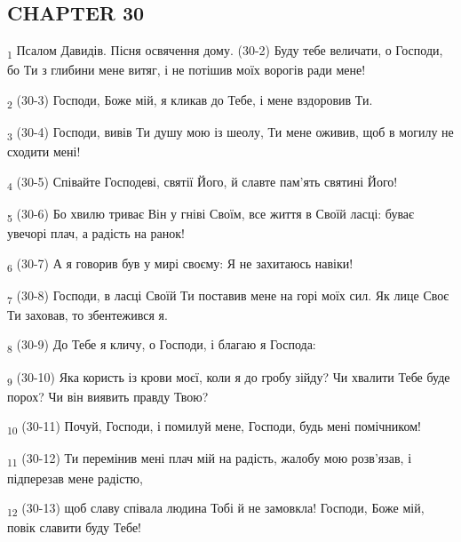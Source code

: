 \subsection{CHAPTER 30}
\begin{tcolorbox}
\textsubscript{1} Псалом Давидів. Пісня освячення дому. (30-2) Буду тебе величати, о Господи, бо Ти з глибини мене витяг, і не потішив моїх ворогів ради мене!
\end{tcolorbox}
\begin{tcolorbox}
\textsubscript{2} (30-3) Господи, Боже мій, я кликав до Тебе, і мене вздоровив Ти.
\end{tcolorbox}
\begin{tcolorbox}
\textsubscript{3} (30-4) Господи, вивів Ти душу мою із шеолу, Ти мене оживив, щоб в могилу не сходити мені!
\end{tcolorbox}
\begin{tcolorbox}
\textsubscript{4} (30-5) Співайте Господеві, святії Його, й славте пам'ять святині Його!
\end{tcolorbox}
\begin{tcolorbox}
\textsubscript{5} (30-6) Бо хвилю триває Він у гніві Своїм, все життя в Своїй ласці: буває увечорі плач, а радість на ранок!
\end{tcolorbox}
\begin{tcolorbox}
\textsubscript{6} (30-7) А я говорив був у мирі своєму: Я не захитаюсь навіки!
\end{tcolorbox}
\begin{tcolorbox}
\textsubscript{7} (30-8) Господи, в ласці Своїй Ти поставив мене на горі моїх сил. Як лице Своє Ти заховав, то збентежився я.
\end{tcolorbox}
\begin{tcolorbox}
\textsubscript{8} (30-9) До Тебе я кличу, о Господи, і благаю я Господа:
\end{tcolorbox}
\begin{tcolorbox}
\textsubscript{9} (30-10) Яка користь із крови моєї, коли я до гробу зійду? Чи хвалити Тебе буде порох? Чи він виявить правду Твою?
\end{tcolorbox}
\begin{tcolorbox}
\textsubscript{10} (30-11) Почуй, Господи, і помилуй мене, Господи, будь мені помічником!
\end{tcolorbox}
\begin{tcolorbox}
\textsubscript{11} (30-12) Ти перемінив мені плач мій на радість, жалобу мою розв'язав, і підперезав мене радістю,
\end{tcolorbox}
\begin{tcolorbox}
\textsubscript{12} (30-13) щоб славу співала людина Тобі й не замовкла! Господи, Боже мій, повік славити буду Тебе!
\end{tcolorbox}

